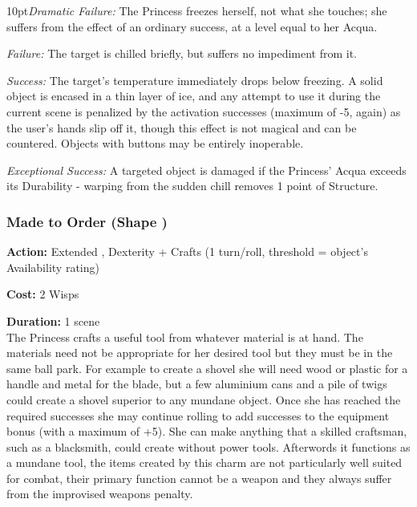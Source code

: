 \begin{myindentpar}{10pt}\emph{Dramatic Failure:} The Princess freezes herself, not what she touches; she suffers from the effect of an ordinary success, at a level equal to her Acqua.

\emph{Failure:} The target is chilled briefly, but suffers no impediment from it.

\emph{Success:} The target's temperature immediately drops below freezing. A solid object is encased in a thin layer of ice, and any attempt to use it during the current scene is penalized by the activation successes (maximum of -5, again) as the user's hands slip off it, though this effect is not magical and can be countered. Objects with buttons may be entirely inoperable.

\emph{Exceptional Success:} A targeted object is damaged if the Princess' Acqua exceeds its Durability - warping from the sudden chill removes 1 point of Structure.\end{myindentpar}

\subsubsection*{Made to Order (Shape \textbullet\textbullet\textbullet)}
\noindent \textbf{Action:} Extended , Dexterity + Crafts (1 turn/roll, threshold = object's Availability rating)

\noindent \textbf{Cost:} 2 Wisps

\noindent \textbf{Duration:} 1 scene\\

\noindent The Princess crafts a useful tool from whatever material is at hand. The materials need not be appropriate for her desired tool but they must be in the same ball park. For example to create a shovel she will need wood or plastic for a handle and metal for the blade, but a few aluminium cans and a pile of twigs could create a shovel superior to any mundane object. Once she has reached the required successes she may continue rolling to add successes to the equipment bonus (with a maximum of +5). She can make anything that a skilled craftsman, such as a blacksmith, could create without power tools. Afterwords it functions as a mundane tool, the items created by this charm are not particularly well suited for combat, their primary function cannot be a weapon and they always suffer from the improvised weapons penalty.

